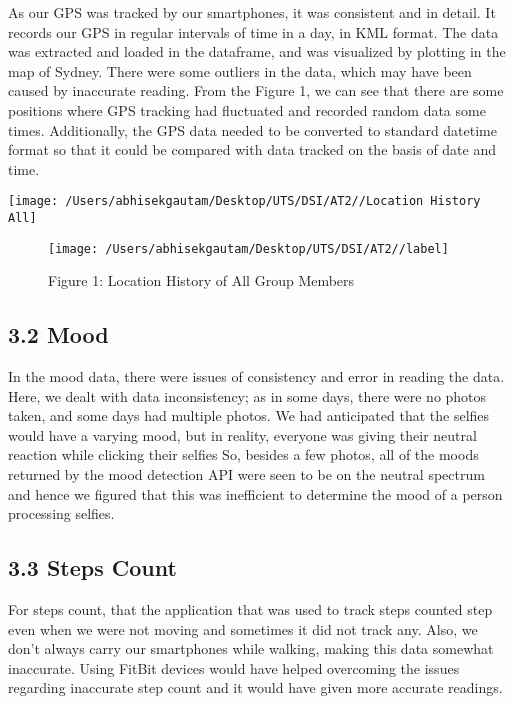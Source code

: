 \documentclass[
]{article}
\begin{document}
As our GPS was tracked by our smartphones, it was consistent and in
detail. It records our GPS in regular intervals of time in a day, in KML
format. The data was extracted and loaded in the dataframe, and was
visualized by plotting in the map of Sydney. There were some outliers in
the data, which may have been caused by inaccurate reading. From the
Figure 1, we can see that there are some positions where GPS tracking
had fluctuated and recorded random data some times. Additionally, the
GPS data needed to be converted to standard datetime format so that it
could be compared with data tracked on the basis of date and time.

\begin{center}\texttt{[image: /Users/abhisekgautam/Desktop/UTS/DSI/AT2//Location History All]} \end{center}

\begin{figure}

{\centering \texttt{[image: /Users/abhisekgautam/Desktop/UTS/DSI/AT2//label]} 

}

\caption{\label{fig:figs}Figure 1: Location History of All Group Members}\label{fig:add_picture93}
\end{figure}

\hypertarget{mood-1}{%
\subsection{3.2 Mood}\label{mood-1}}

In the mood data, there were issues of consistency and error in reading
the data. Here, we dealt with data inconsistency; as in some days, there
were no photos taken, and some days had multiple photos. We had
anticipated that the selfies would have a varying mood, but in reality,
everyone was giving their neutral reaction while clicking their selfies
So, besides a few photos, all of the moods returned by the mood
detection API were seen to be on the neutral spectrum and hence we
figured that this was inefficient to determine the mood of a person
processing selfies.

\hypertarget{steps-count-1}{%
\subsection{3.3 Steps Count}\label{steps-count-1}}

For steps count, that the application that was used to track steps
counted step even when we were not moving and sometimes it did not track
any. Also, we don't always carry our smartphones while walking, making
this data somewhat inaccurate. Using FitBit devices would have helped
overcoming the issues regarding inaccurate step count and it would have
given more accurate readings.
\end{document}

